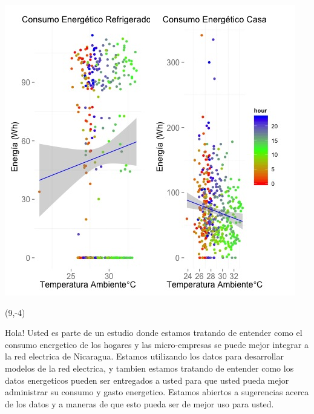 \documentclass{article}\usepackage[]{graphicx}\usepackage[]{color}
\newenvironment{knitrout}{}{} %
\begin{document}
\begin{knitrout}
\color{fgcolor}
\includegraphics[scale=0.75]{figure/A8_correlaciones} 
\end{knitrout}

 \begin{textblock}{1}(9,-4)
\begin{minipage}{20em}
\begingroup

\endgroup
\end{minipage}
\end{textblock}

\vspace{70px}
\begin{knitrout}
Hola! Usted es parte de un estudio donde estamos tratando de entender como el consumo energetico de los hogares y las micro-empresas se puede mejor integrar a la red electrica de Nicaragua. Estamos utilizando los datos para desarrollar modelos de la red electrica, y tambien estamos tratando de entender como los datos energeticos pueden ser entregados a usted para que usted pueda mejor administrar su consumo y gasto energetico.  Estamos abiertos a sugerencias acerca de los datos y a maneras de que esto pueda ser de mejor uso para usted.
\end{knitrout}
\end{document}
